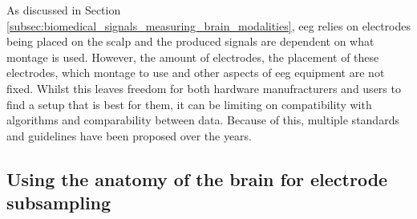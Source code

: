 



As discussed in Section \ref{subsec:biomedical_signals_measuring_brain_modalities}, \gls{eeg} relies on electrodes being placed on the scalp and the produced signals are dependent on what montage is used.
However, the amount of electrodes, the placement of these electrodes, which montage to use and other aspects of \gls{eeg} equipment are not fixed. %
Whilst this leaves freedom for both hardware manufracturers and users to find a setup that is best for them, it can be limiting on compatibility with algorithms and comparability between data.
Because of this, multiple standards and guidelines have been proposed over the years.




\subsection{Using the anatomy of the brain for electrode subsampling}
\label{subsec:biomedical_signals_working_with_eeg_anatomy}

